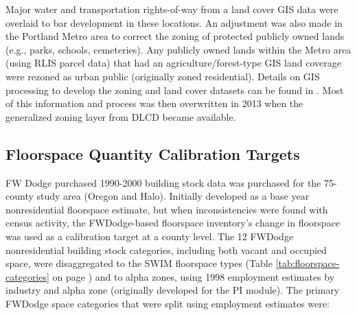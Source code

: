 Major water and transportation rights-of-way from a land cover GIS data were overlaid to bar development in these locations. An adjustment was also made in the Portland Metro area to correct the zoning of protected publicly owned lands (e.g., parks, schools, cemeteries). Any publicly owned lands within the Metro area (using RLIS parcel data) that had an agriculture/forest-type GIS land coverage were rezoned as urban public (originally zoned residential). Details on GIS processing to develop the zoning and land cover datasets can be found in \cite{weidner04}. Most of this information and process was then overwritten in 2013 when the generalized zoning layer from DLCD became available.

\subsection{Floorspace Quantity Calibration Targets}
FW Dodge purchased 1990-2000 building stock data was purchased for the 75-county study area (Oregon and Halo). Initially developed as a base year nonresidential floorspace estimate, but when inconsistencies were found with census activity, the FWDodge-based floorspace inventory's change in floorspace was used as a calibration target at a county level. The 12 FWDodge nonresidential building stock categories, including both vacant and occupied space, were disaggregated to the SWIM floorspace types (Table \ref{tab:floorspace-categories} on page \pageref{tab:floorspace-categories}) and to alpha zones, using 1998 employment estimates by industry and alpha zone (originally developed for the PI module). The primary FWDodge space categories that were split using employment estimates were:
